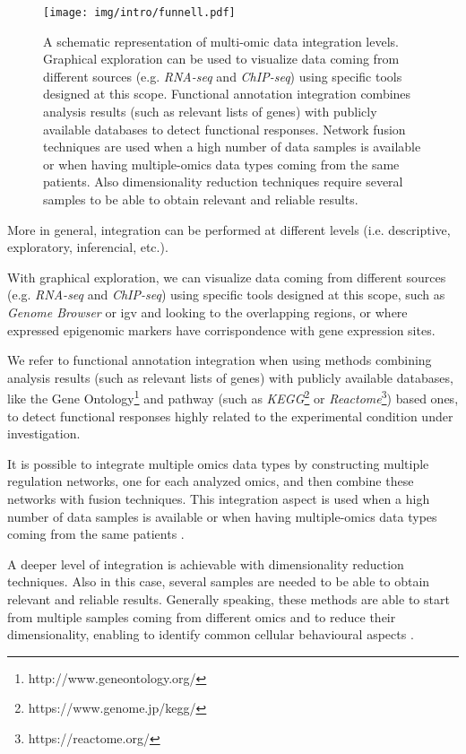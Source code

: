 \begin{figure}[h]
\centering
\texttt{[image: img/intro/funnell.pdf]}
\caption[Integration Funnell]{A schematic representation of multi-omic data integration levels.
Graphical exploration can be used to visualize data coming from different sources (e.g. \textit{RNA-seq} and \textit{ChIP-seq}) using specific tools designed at this scope.
Functional annotation integration combines analysis results (such as relevant lists of genes) with publicly available databases to detect functional responses.
Network fusion techniques are used when a high number of data samples is available or when having multiple-omics data types coming from the same patients.
Also dimensionality reduction techniques require several samples to be able to obtain relevant and reliable results.
}
\label{fig:funnell}
\end{figure}

More in general, integration can be performed at different levels (i.e. descriptive, exploratory, inferencial, etc.).

With graphical exploration, we can visualize data coming from different sources (e.g. \textit{RNA-seq} and \textit{ChIP-seq}) using specific tools designed at this scope, such as \textit{Genome Browser} \cite{Karolchik2011} or \gls{igv} \cite{Robinson2011, Thorvaldsdottir2013} and looking to the overlapping regions, or where expressed epigenomic markers have corrispondence with gene expression sites.

We refer to functional annotation integration when using methods combining analysis results (such as relevant lists of genes) with publicly available databases,  like the Gene Ontology\footnote{http://www.geneontology.org/} and pathway (such as \textit{KEGG}\footnote{https://www.genome.jp/kegg/} or \textit{Reactome}\footnote{https://reactome.org/}) based ones, to detect functional responses highly related to the experimental condition under investigation.

It is possible to integrate multiple omics data types by constructing multiple regulation networks, one for each analyzed omics, and then combine these networks with fusion techniques.
This integration aspect is used when a high number of data samples is available or when having multiple-omics data types coming from the same patients \cite{Wang2014}.

A deeper level of integration is achievable with dimensionality reduction techniques. 
Also in this case, several samples are needed to be able to obtain relevant and reliable results.
Generally speaking, these methods are able to start from multiple samples coming from different omics and to reduce their dimensionality, enabling to identify common cellular behavioural aspects \cite{Rohart2017, Argelaguet2018}.



